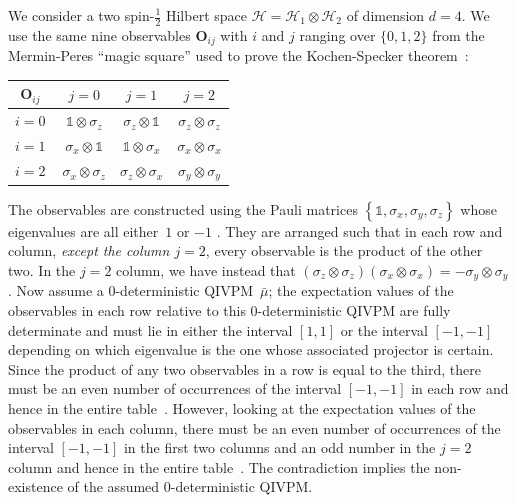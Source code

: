 \documentclass[english,reprint, aps, prl,superscriptaddress, showpacs,
showkeys, longbibliography, amsmath, amssymb, floatfix]{revtex4-1}
\theoremstyle{plain}
\theoremstyle{definition}
\newcommand{\Hilb}{\mathcal{H}}
\begin{document}
We consider a two spin-$\frac{1}{2}$ Hilbert space
$\Hilb=\Hilb_1\otimes\Hilb_2$ of dimension $d=4$. We use the same nine
observables $\mathbf{O}_{ij}$ with $i$ and $j$ ranging over
$\{0,1,2\}$ from the Mermin-Peres ``magic square'' used to prove the
Kochen-Specker
theorem~\cite{Mermin1990Simple,peres1995quantum,Griffiths2003}:

{\renewcommand{\arraystretch}{2}%
\begin{center}
\begin{tabular}{r|@{\quad}c@{\quad}|@{\quad}c@{\quad}|@{\quad}c@{\quad}|}
$\mathbf{O}_{ij}$~ & $j=0$ & $j=1$ & $j=2$ \\
\hline 
$i=0~$ & $\mathbb{1}\otimes\sigma_{z}$  & $\sigma_{z}\otimes\mathbb{1}$  & $\sigma_{z}\otimes\sigma_{z}$ \tabularnewline
\hline 
$i=1~$ & $\sigma_{x}\otimes\mathbb{1}$  & $\mathbb{1}\otimes\sigma_{x}$  & $\sigma_{x}\otimes\sigma_{x}$ \tabularnewline
\hline 
$i=2~$ & $\sigma_{x}\otimes\sigma_{z}$  & $\sigma_{z}\otimes\sigma_{x}$  & $\sigma_{y}\otimes\sigma_{y}$ \tabularnewline
\hline 
\end{tabular}
\par\end{center}
} 

\noindent The observables are constructed using the Pauli matrices
$\left\{ \mathbb{1},\sigma_{x},\sigma_{y},\sigma_{z}\right\}$ whose
eigenvalues are all either~$1$ or $-1$
\cite{Redhead1987-REDINA,544199,Griffiths2003,Jaeger2007,Mermin2007}.
They are arranged such that in
each row and column, \emph{except the column $j=2$}, every observable
is the product of the other two. In the $j=2$ column, we have instead
that
$\left(\sigma_{z}\otimes\sigma_{z}\right)\left(\sigma_{x}\otimes\sigma_{x}\right)=-\sigma_{y}\otimes\sigma_{y}$. Now
assume a 0-deterministic QIVPM~${\bar{\mu}}$; the expectation values
of the observables in each row relative to this 0-deterministic QIVPM
are fully determinate and must lie in either the interval $[1,1]$ or
the interval $[-1,-1]$ depending on which eigenvalue is the one whose
associated projector is certain. Since the product of any two
observables in a row is equal to the third, there must be an even
number of occurrences of the interval $[-1,-1]$ in each row and hence
in the entire table~\cite{TaiThesis2018}. However, looking at the expectation values of the
observables in each column, there must be an even number of
occurrences of the interval $[-1,-1]$ in the first two columns and an
odd number in the $j=2$ column and hence in the entire table~\cite{TaiThesis2018}. The
contradiction implies the non-existence of the assumed 0-deterministic
QIVPM. 
\end{document}

